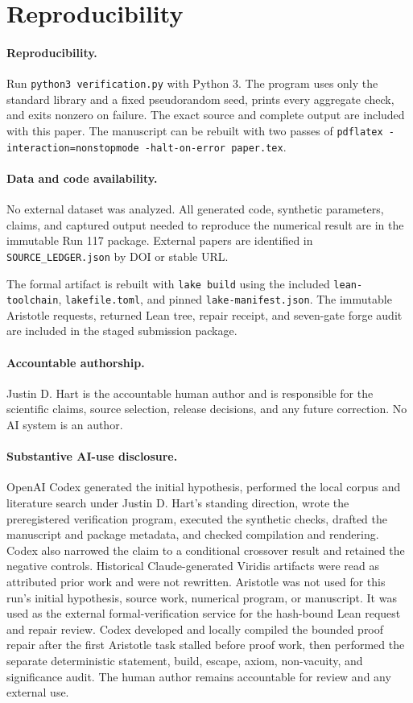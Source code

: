 \documentclass[10pt,twocolumn]{article}
\begin{document}
\section{Reproducibility}

\paragraph{Reproducibility.}
Run \texttt{python3 verification.py} with Python 3. The program uses only the
standard library and a fixed pseudorandom seed, prints every aggregate check,
and exits nonzero on failure. The exact source and complete output are included
with this paper. The manuscript can be rebuilt with two passes of
\texttt{pdflatex -interaction=nonstopmode -halt-on-error paper.tex}.

\paragraph{Data and code availability.}
No external dataset was analyzed. All generated code, synthetic parameters,
claims, and captured output needed to reproduce the numerical result are in the
immutable Run 117 package. External papers are identified in
\texttt{SOURCE\_LEDGER.json} by DOI or stable URL.

The formal artifact is rebuilt with \texttt{lake build} using the included
\texttt{lean-toolchain}, \texttt{lakefile.toml}, and pinned
\texttt{lake-manifest.json}. The immutable Aristotle requests, returned Lean
tree, repair receipt, and seven-gate forge audit are included in the staged
submission package.

\paragraph{Accountable authorship.}
Justin D. Hart is the accountable human author and is responsible for the
scientific claims, source selection, release decisions, and any future
correction. No AI system is an author.

\paragraph{Substantive AI-use disclosure.}
OpenAI Codex generated the initial hypothesis, performed the local corpus and
literature search under Justin D. Hart's standing direction, wrote the
preregistered verification program, executed the synthetic checks, drafted the
manuscript and package metadata, and checked compilation and rendering. Codex
also narrowed the claim to a conditional crossover result and retained the
negative controls. Historical Claude-generated Viridis artifacts were read as
attributed prior work and were not rewritten. Aristotle was not used for this
run's initial hypothesis, source work, numerical program, or manuscript. It
was used as the external formal-verification service for the hash-bound Lean
request and repair review. Codex developed and locally compiled the bounded
proof repair after the first Aristotle task stalled before proof work, then
performed the separate deterministic statement, build, escape, axiom,
non-vacuity, and significance audit. The human author remains accountable for
review and any external use.
\end{document}
